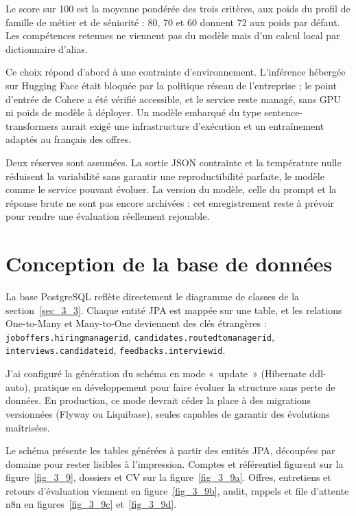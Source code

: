 \documentclass[]{./tpl/isipfe}
\def\_{\textunderscore\allowbreak}
\begin{document}
Le score sur 100 est la moyenne pondérée des trois critères, aux poids du profil de famille de métier et de séniorité : 80, 70 et 60 donnent 72 aux poids par défaut. Les compétences retenues ne viennent pas du modèle mais d’un calcul local par dictionnaire d’alias.

Ce choix répond d’abord à une contrainte d’environnement. L’inférence hébergée sur Hugging Face était bloquée par la politique réseau de l’entreprise ; le point d’entrée de Cohere a été vérifié accessible, et le service reste managé, sans GPU ni poids de modèle à déployer. Un modèle embarqué du type sentence-transformers aurait exigé une infrastructure d’exécution et un entraînement adaptés au français des offres.

Deux réserves sont assumées. La sortie JSON contrainte et la température nulle réduisent la variabilité sans garantir une reproductibilité parfaite, le modèle comme le service pouvant évoluer. La version du modèle, celle du prompt et la réponse brute ne sont pas encore archivées : cet enregistrement reste à prévoir pour rendre une évaluation réellement rejouable.

\section{Conception de la base de données}
\label{sec_3_7}
La base PostgreSQL reflète directement le diagramme de classes de la section~\ref{sec_3_3}. Chaque entité JPA est mappée sur une table, et les relations One-to-Many et Many-to-One deviennent des clés étrangères : \texttt{job\allowbreak\_offers\allowbreak.hiring\allowbreak\_manager\allowbreak\_id}, \texttt{candidates\allowbreak.routed\allowbreak\_to\allowbreak\_manager\allowbreak\_id}, \texttt{interviews\allowbreak.candidate\allowbreak\_id}, \texttt{feedbacks\allowbreak.interview\allowbreak\_id}.

J’ai configuré la génération du schéma en mode «~update~» (Hibernate ddl-auto), pratique en développement pour faire évoluer la structure sans perte de données. En production, ce mode devrait céder la place à des migrations versionnées (Flyway ou Liquibase), seules capables de garantir des évolutions maîtrisées.

Le schéma présente les tables générées à partir des entités JPA, découpées par domaine pour rester lisibles à l’impression. Comptes et référentiel figurent sur la figure~\ref{fig_3_9}, dossiers et CV sur la figure~\ref{fig_3_9a}. Offres, entretiens et retours d’évaluation viennent en figure~\ref{fig_3_9b}, audit, rappels et file d’attente n8n en figures~\ref{fig_3_9c} et~\ref{fig_3_9d}.
\end{document}
